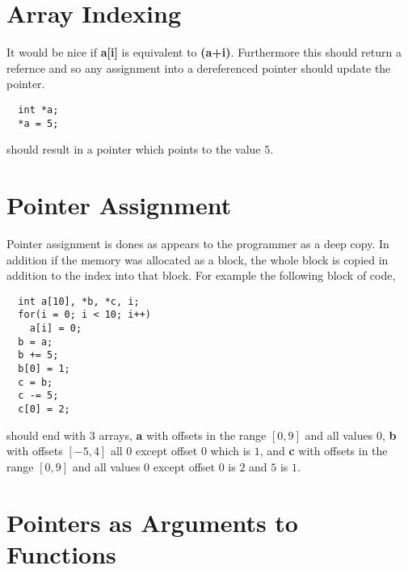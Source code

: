\section{Array Indexing}
It would be nice if \textbf{a[i]} is equivalent to \textbf{\*(a+i)}. Furthermore this should return a refernce and so any assignment into a dereferenced 
pointer should update the pointer.
\begin{verbatim}
  int *a;
  *a = 5;
\end{verbatim}
should result in a pointer which points to the value $5$.
\section{Pointer Assignment}
Pointer assignment is dones as appears to the programmer as a deep copy. In addition if the memory was allocated as a block, the whole block is copied in addition to the 
index into that block. For example the following block of code,
\begin{verbatim}
  int a[10], *b, *c, i;
  for(i = 0; i < 10; i++)
    a[i] = 0;
  b = a;
  b += 5;
  b[0] = 1;
  c = b;
  c -= 5;
  c[0] = 2;  
\end{verbatim}
should end with 3 arrays, \textbf{a} with offsets in the range $\left[0,9\right]$ and all values $0$, \textbf{b} with offsets $\left[-5,4\right]$ all $0$ except offset 
$0$ which is $1$, and \textbf{c} with offsets in the range $\left[0,9\right]$ and all values $0$ except offset $0$ is $2$ and $5$ is $1$.
\section{Pointers as Arguments to Functions}
